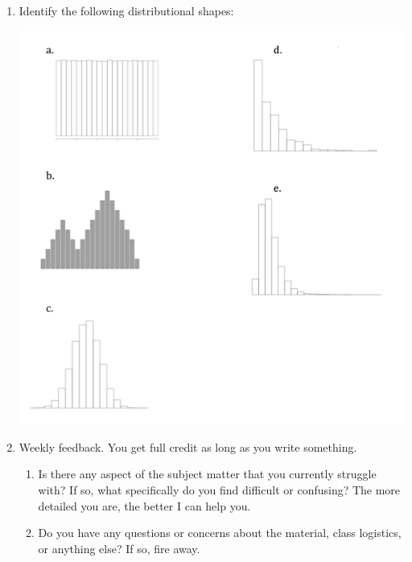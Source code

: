 \documentclass{article}\usepackage{graphicx, color}
\numberwithin{equation}{section}
\begin{document}
\begin{flushleft}
\begin{enumerate}[1. ]
\item Identify the following distributional shapes:

 \includegraphics{../../fig/hw2shapes.png}













\item Weekly feedback. You get full credit as long as you write something.
\begin{enumerate}[1. ]
\item Is there any aspect of the subject matter that you currently struggle with? If so, what specifically do you find difficult or confusing? The more detailed you are, the better I can help you.
\item Do you have any questions or concerns about the material, class logistics, or anything else? If so, fire away.
\end{enumerate}

\end{enumerate}




\end{flushleft}
% 
%
\end{document}
